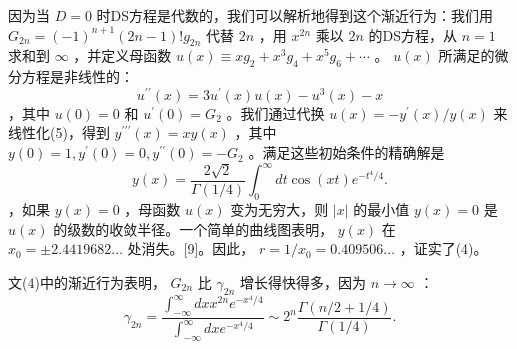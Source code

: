 \documentclass[UTF8]{article}
\begin{document}
因为当 $D=0$ 时DS方程是代数的，我们可以解析地得到这个渐近行为：我们用 $G_{2 n}=(-1)^{n+1}(2 n-1) ! g_{2 n}$ 代替 $2 n$ ，用 $x^{2 n}$ 乘以 $2 n$ 的DS方程，从 $n=1$ 求和到 $\infty$ ，并定义母函数 $u(x) \equiv x g_2+x^3 g_4+x^5 g_6+\cdots$ 。 $u(x)$ 所满足的微分方程是非线性的： $$u^{\prime \prime}(x)=3 u^{\prime}(x) u(x)-u^3(x)-x
$$ ，其中 $u(0)=0$ 和 $u^{\prime}(0)=G_2$ 。我们通过代换 $u(x)=-y^{\prime}(x) / y(x)$ 来线性化(5)，得到 $y^{\prime \prime \prime}(x)=x y(x)$ ，其中 $y(0)=1, y^{\prime}(0)=0, y^{\prime \prime}(0)=-G_2$ 。满足这些初始条件的精确解是 $$y(x)=\frac{2 \sqrt{2}}{\Gamma(1 / 4)} \int_0^{\infty} d t \cos (x t) e^{-t^4 / 4} .
$$ ，如果 $y(x)=0$ ，母函数 $u(x)$ 变为无穷大，则 $|x|$ 的最小值 $y(x)=0$ 是 $u(x)$ 的级数的收敛半径。一个简单的曲线图表明， $y(x)$ 在 $x_0= \pm 2.4419682 \ldots$ 处消失。[9]。因此， $r=1 / x_0=0.409506 \ldots$ ，证实了(4)。


文(4)中的渐近行为表明， $G_{2 n}$ 比 $\gamma_{2 n}$ 增长得快得多，因为 $n \rightarrow \infty$ ： $$
\gamma_{2 n}=\frac{\int_{-\infty}^{\infty} d x x^{2 n} e^{-x^4 / 4}}{\int_{-\infty}^{\infty} d x e^{-x^4 / 4}} \sim 2^n \frac{\Gamma(n / 2+1 / 4)}{\Gamma(1 / 4)} .
$$ 
\end{document}
